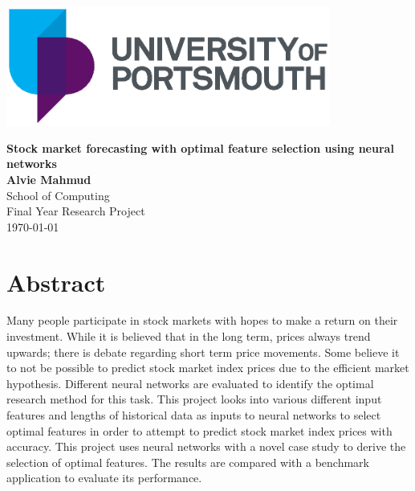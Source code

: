 \documentclass[12pt, a4paper]{report}
\begin{document}
\thispagestyle{empty}	%
\vspace*{1mm}	%
\includegraphics[width=0.8\textwidth, center]{figures/UoP_Master_Logo_Linear_PMS.eps}
\vspace{10mm}

\begin{center}
\huge\textbf{\textsf{Stock market forecasting with optimal feature selection using neural networks}}\\
\vspace{10mm}
\large \textbf{Alvie Mahmud}\\
\vspace{10mm}
\normalsize School of Computing \\ Final Year Research Project \\

\vspace{10mm}
%
\today	%
\end{center}
\newpage
{}	%
\chapter*{Abstract}	%

Many people participate in stock markets with hopes to make a return on their investment. While it
is believed that in the long term, prices always trend upwards; there is debate regarding short term
price movements. Some believe it to not be possible to predict stock market index prices due to the
efficient market hypothesis. Different neural networks are evaluated to identify the optimal
research method for this task. This project looks into various different input features and lengths of
historical data as inputs to neural networks to select optimal features in order to attempt to predict
stock market index prices with accuracy. This project uses neural networks with a novel case study to
derive the selection of optimal features. The results are compared with a benchmark application to
evaluate its performance.
\vspace{10mm}
\end{document}
